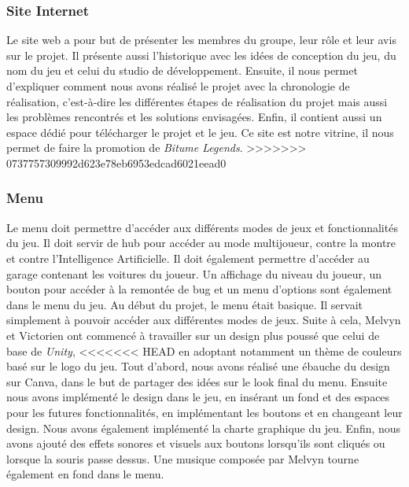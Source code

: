 \documentclass[a4paper,12pt]{article}
\newcommand{\btmlgs}{\textsl{Bitume Legends}}
\newcommand{\AI}{Intelligence Artificielle}
\begin{document}
            \subsubsection{Site Internet}
                Le site web a pour but de présenter les membres du groupe, leur rôle et leur avis sur le projet.
                Il présente aussi l'historique avec les idées de conception du jeu, du nom du jeu et celui du studio
                de développement. Ensuite, il nous permet d'expliquer comment nous avons réalisé le projet avec la
                chronologie de réalisation, c'est-à-dire les différentes étapes de réalisation du projet mais aussi
                les problèmes rencontrés et les solutions envisagées. Enfin, il contient aussi
                un espace dédié pour télécharger le projet et le jeu. Ce site est notre vitrine, il nous permet de faire
                la promotion de \btmlgs.
>>>>>>> 0737757309992d623e78eb6953edcad6021eead0
        
            \subsubsection{Menu}
                Le menu doit permettre d'accéder aux différents modes de jeux et fonctionnalités du jeu.
                Il doit servir de hub pour accéder au mode multijoueur, contre la montre et contre l'\AI.
                Il doit également permettre d'accéder au garage contenant les voitures du joueur. Un affichage
                du niveau du joueur, un bouton pour accéder à la remontée de bug et un menu d'options 
                sont également dans le menu du jeu. Au début du projet, le menu était basique. Il servait 
                simplement à pouvoir accéder aux différentes modes de jeux. Suite à cela, Melvyn et Victorien 
                ont commencé à travailler sur un design plus poussé que celui de base de \textsl{Unity}, 
<<<<<<< HEAD
                en adoptant notamment un thème de couleurs basé sur le logo du jeu. Tout d'abord, nous avons 
                réalisé une ébauche du design sur Canva, dans le but de partager des idées sur le look
                final du menu. Ensuite nous avons implémenté le design dans le jeu, en insérant un fond
                et des espaces pour les futures fonctionnalités, en implémentant les boutons et en changeant
                leur design. Nous avons également implémenté la charte graphique du jeu. Enfin, nous avons 
                ajouté des effets sonores et visuels aux boutons lorsqu'ils sont cliqués ou lorsque
                la souris passe dessus. Une musique composée par Melvyn tourne également en fond dans le menu.
\end{document}
